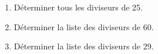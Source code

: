 
\begin{enumerate}
\item Déterminer tous les diviseurs de 25.
\item Déterminer la liste des diviseurs de 60.
\item Déterminer la liste des diviseurs de 29.
\end{enumerate}